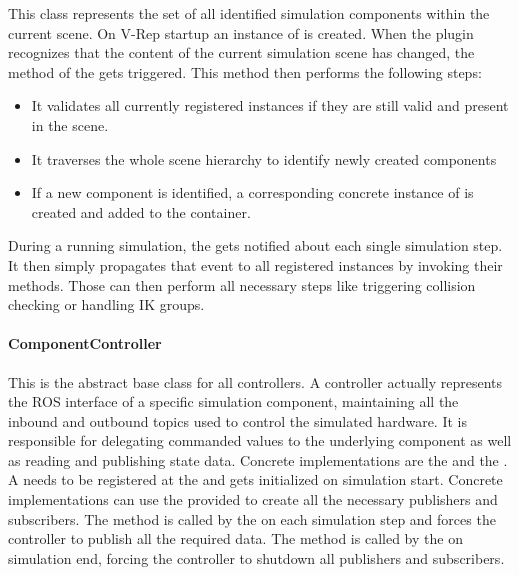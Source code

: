 This class represents the set of all identified simulation components within the current scene. On V-Rep startup an instance of  is created. When the plugin recognizes that the content of the current simulation scene has changed, the method  of the  gets triggered. This method then performs the following steps:
\begin{itemize}

\item
It validates all currently registered  instances if they are still valid and present in the scene.
\item
It traverses the whole scene hierarchy to identify newly created components
\item
If a new component is identified, a corresponding concrete instance of  is created and added to the container.

\end{itemize}
  
During a running simulation, the  gets notified about each single simulation step. It then simply propagates that event to all registered  instances by invoking their  methods. Those can then perform all necessary steps like triggering collision checking or handling IK groups.

\paragraph{ComponentController}

This is the abstract base class for all controllers. A controller actually represents the ROS interface of a specific simulation component, maintaining all the inbound and outbound topics used to control the simulated hardware. It is responsible for delegating commanded values to the underlying component as well as reading and publishing state data. Concrete implementations are the  and the . A  needs to be registered at the  and gets initialized on simulation start. Concrete implementations can use the provided  to create all the necessary publishers and subscribers. The  method is called by the  on each simulation step and forces the controller to publish all the required data. The  method is called by the  on simulation end, forcing the controller to shutdown all publishers and subscribers.
  
